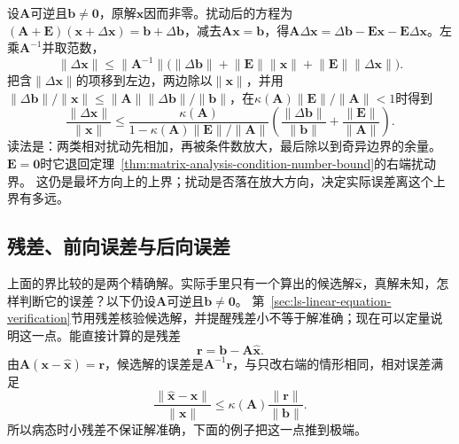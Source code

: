 设$\bm A$可逆且$\bm b\ne\bm0$，原解$\bm x$因而非零。扰动后的方程为$(\bm A+\bm E)(\bm x+\Delta\bm x)=\bm b+\Delta\bm b$，减去$\bm A\bm x=\bm b$，得$\bm A\Delta\bm x=\Delta\bm b-\bm E\bm x-\bm E\Delta\bm x$。左乘$\bm A^{-1}$并取范数，
\[
 \lVert\Delta\bm x\rVert\leq\lVert\bm A^{-1}\rVert\bigl(\lVert\Delta\bm b\rVert+\lVert\bm E\rVert\lVert\bm x\rVert+\lVert\bm E\rVert\lVert\Delta\bm x\rVert\bigr).
\]
把含$\lVert\Delta\bm x\rVert$的项移到左边，两边除以$\lVert\bm x\rVert$，并用$\lVert\Delta\bm b\rVert/\lVert\bm x\rVert\leq\lVert\bm A\rVert\lVert\Delta\bm b\rVert/\lVert\bm b\rVert$，在$\kappa(\bm A)\lVert\bm E\rVert/\lVert\bm A\rVert<1$时得到
\begin{equation}
 \frac{\lVert\Delta\bm x\rVert}{\lVert\bm x\rVert}
 \leq
 \frac{\kappa(\bm A)}{1-\kappa(\bm A)\lVert\bm E\rVert/\lVert\bm A\rVert}
 \left(
 \frac{\lVert\Delta\bm b\rVert}{\lVert\bm b\rVert}
 +\frac{\lVert\bm E\rVert}{\lVert\bm A\rVert}
 \right).
 \label{eq:matrix-analysis-linear-system-perturbation}
\end{equation}
读法是：两类相对扰动先相加，再被条件数放大，最后除以到奇异边界的余量。
$\bm E=\bm0$时它退回定理~\ref{thm:matrix-analysis-condition-number-bound}的右端扰动界。
这仍是最坏方向上的上界；扰动是否落在放大方向，决定实际误差离这个上界有多远。

\subsection{残差、前向误差与后向误差}
\label{sec:ls-numerical-stability}
\label{sec:ls-data-computation-error}
\label{sec:linear-algebra-error-propagation}
\label{sec:ch06-error-propagation}
\label{sec:ls-result-verification}
\label{sec:matrix-analysis-error-verification}

上面的界比较的是两个精确解。实际手里只有一个算出的候选解$\widehat{\bm x}$，真解未知，怎样判断它的误差？以下仍设$\bm A$可逆且$\bm b\ne\bm0$。
第~\ref{sec:ls-linear-equation-verification}节用残差核验候选解，并提醒残差小不等于解准确；现在可以定量说明这一点。能直接计算的是残差
\begin{equation}
 \bm r=\bm b-\bm A\widehat{\bm x}.
 \label{eq:matrix-analysis-residual}
\end{equation}
由$\bm A(\bm x-\widehat{\bm x})=\bm r$，候选解的误差是$\bm A^{-1}\bm r$，与只改右端的情形相同，相对误差满足
\[
 \frac{\lVert\widehat{\bm x}-\bm x\rVert}{\lVert\bm x\rVert}
 \leq\kappa(\bm A)\frac{\lVert\bm r\rVert}{\lVert\bm b\rVert}.
\]
所以病态时小残差不保证解准确，下面的例子把这一点推到极端。

